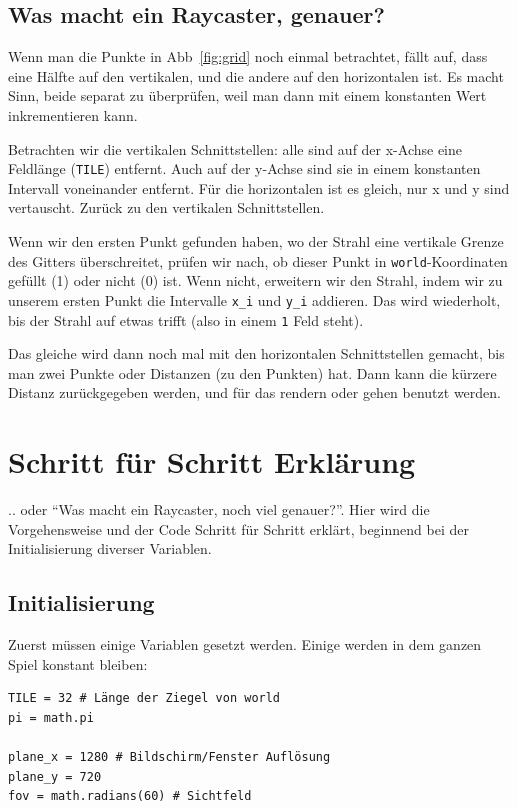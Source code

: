 \documentclass[a4paper,12pt]{report}
\begin{document}
\subsection{Was macht ein Raycaster, genauer?}
Wenn man die Punkte in Abb~\ref{fig:grid} noch einmal betrachtet, fällt auf, dass eine Hälfte auf den vertikalen, und die andere auf den horizontalen ist. Es macht Sinn, beide separat zu überprüfen, weil man dann mit einem konstanten Wert inkrementieren kann.

Betrachten wir die vertikalen Schnittstellen: alle sind auf der x-Achse eine Feldlänge (\texttt{TILE}) entfernt. Auch auf der y-Achse sind sie in einem konstanten Intervall voneinander entfernt. Für die horizontalen ist es gleich, nur x und y sind vertauscht. Zurück zu den vertikalen Schnittstellen.

Wenn wir den ersten Punkt gefunden haben, wo der Strahl eine vertikale Grenze des Gitters überschreitet, prüfen wir nach, ob dieser Punkt in \texttt{world}-Koordinaten gefüllt (1) oder nicht (0) ist. Wenn nicht, erweitern wir den Strahl, indem wir zu unserem ersten Punkt die Intervalle \texttt{x\_i} und \texttt{y\_i} addieren. Das wird wiederholt, bis der Strahl auf etwas trifft (also in einem \texttt{1} Feld steht).

Das gleiche wird dann noch mal mit den horizontalen Schnittstellen gemacht, bis man zwei Punkte oder Distanzen (zu den Punkten) hat. Dann kann die kürzere Distanz zurückgegeben werden, und für das rendern oder gehen benutzt werden.

\section{Schritt für Schritt Erklärung}

.. oder ``Was macht ein Raycaster, noch viel genauer?''. Hier wird die Vorgehensweise und der Code Schritt für Schritt erklärt, beginnend bei der Initialisierung diverser Variablen.

\subsection{Initialisierung}

Zuerst müssen einige Variablen gesetzt werden. Einige werden in dem ganzen Spiel konstant bleiben:
\begin{Verbatim}[baselinestretch=1.0, xleftmargin=1cm]
TILE = 32 # Länge der Ziegel von world
pi = math.pi

plane_x = 1280 # Bildschirm/Fenster Auflösung
plane_y = 720
fov = math.radians(60) # Sichtfeld
\end{Verbatim}
\end{document}
